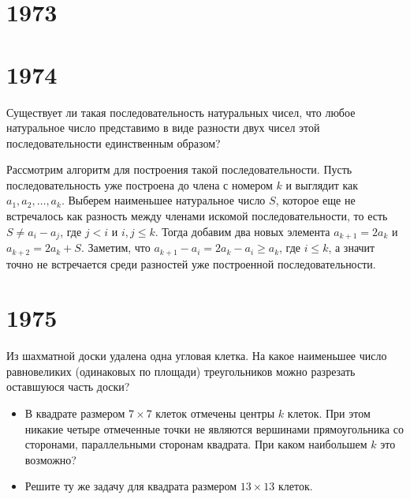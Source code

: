 \documentclass[11pt, a4paper]{template}
\begin{document}
\chapter{1973}



\chapter{1974}

\begin{exercise}[M287]
Существует ли такая последовательность натуральных чисел, что любое натуральное число представимо в виде разности двух чисел этой последовательности единственным образом?
\end{exercise}

\begin{solution}
Рассмотрим алгоритм для построения такой последовательности. Пусть последовательность уже построена до члена с номером $k$ и выглядит как $a_{1}, a_{2}, \dots, a_{k}$. Выберем наименьшее натуральное число $S$, которое еще не встречалось как разность между членами искомой последовательности, то есть $S \neq a_{i} - a_{j}$, где $j < i$ и $i, j \leqslant k$. Тогда добавим два новых элемента $a_{k+1} = 2a_{k}$ и $a_{k+2} = 2a_{k} + S$. Заметим, что $a_{k+1} - a_{i} = 2a_{k} - a_{i} \geqslant a_{k}$, где $i \leqslant k$, а значит точно не встречается среди разностей уже построенной последовательности. 
\end{solution}

\chapter{1975}

\begin{exercise}[M306]
Из шахматной доски удалена одна угловая клетка. На какое наименьшее число равновеликих (одинаковых по площади) треугольников можно разрезать оставшуюся часть доски?
\end{exercise}

\begin{exercise}[M335]
\begin{itemize}
\item В квадрате размером $7 \times 7$ клеток отмечены центры $k$ клеток. При этом никакие четыре отмеченные точки не являются вершинами прямоугольника со сторонами, параллельными сторонам квадрата. При каком наибольшем $k$ это возможно?
\item Решите ту же задачу для квадрата размером $13 \times 13$ клеток.
\end{itemize}
\end{exercise}
\end{document}
